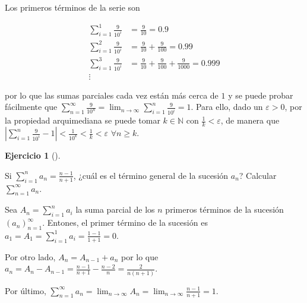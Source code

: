 \documentclass[
  a4paper,
]{scrreport}
\theoremstyle{definition}
\newtheorem{exercise}{Ejercicio}[chapter]
\theoremstyle{remark}
\begin{document}
\begin{tcolorbox}[enhanced jigsaw, rightrule=.15mm, opacityback=0, bottomtitle=1mm, titlerule=0mm, toprule=.15mm, breakable, colframe=quarto-callout-tip-color-frame, left=2mm, opacitybacktitle=0.6, title=\textcolor{quarto-callout-tip-color}{\faLightbulb}\hspace{0.5em}{Solución}, toptitle=1mm, colback=white, colbacktitle=quarto-callout-tip-color!10!white, arc=.35mm, bottomrule=.15mm, coltitle=black, leftrule=.75mm]

Los primeros términos de la serie son

\begin{align*}
\sum_{i=1}^1 \frac{9}{10^i} &= \frac{9}{10} = 0.9\\ 
\sum_{i=1}^2 \frac{9}{10^i} &= \frac{9}{10} + \frac{9}{100} = 0.99\\ 
\sum_{i=1}^3 \frac{9}{10^i} &= \frac{9}{10} + \frac{9}{100} + \frac{9}{1000} = 0.999\\ 
\vdots
\end{align*}

por lo que las sumas parciales cada vez están más cerca de \(1\) y se
puede probar fácilmente que
\(\sum_{n=1}^\infty \frac{9}{10^n} = \lim_{n\to\infty} \sum_{i=1}^n \frac{9}{10^i} = 1\).
Para ello, dado un \(\varepsilon>0\), por la propiedad arquimediana se
puede tomar \(k\in\mathbb{N}\) con \(\frac{1}{k}<\varepsilon\), de
manera que
\(|\sum_{i=1}^n \frac{9}{10^i} -1|<\frac{1}{10^k}<\frac{1}{k}<\varepsilon\)
\(\forall n\geq k\).

\end{tcolorbox}

\begin{exercise}[]\protect\hypertarget{exr-sumas-parciales}{}\label{exr-sumas-parciales}

Si \(\sum_{i=1}^n a_n=\frac{n-1}{n+1}\), ¿cuál es el término general de
la sucesión \(a_n\)? Calcular \(\sum_{n=1}^\infty a_n\).

\end{exercise}

\begin{tcolorbox}[enhanced jigsaw, rightrule=.15mm, opacityback=0, bottomtitle=1mm, titlerule=0mm, toprule=.15mm, breakable, colframe=quarto-callout-tip-color-frame, left=2mm, opacitybacktitle=0.6, title=\textcolor{quarto-callout-tip-color}{\faLightbulb}\hspace{0.5em}{Solución}, toptitle=1mm, colback=white, colbacktitle=quarto-callout-tip-color!10!white, arc=.35mm, bottomrule=.15mm, coltitle=black, leftrule=.75mm]

Sea \(A_n=\sum_{i=1}^n a_i\) la suma parcial de los \(n\) primeros
términos de la sucesión \((a_n)_{n=1}^\infty\). Entones, el primer
término de la sucesión es
\(a_1 = A_1= \sum_{i=1}^1 a_i = \frac{1-1}{1+1} = 0\).

Por otro lado, \(A_n=A_{n-1}+a_n\) por lo que
\(a_n=A_n-A_{n-1} = \frac{n-1}{n+1}-\frac{n-2}{n} = \frac{2}{n(n+1)}\).

Por último,
\(\sum_{n=1}^\infty a_n = \lim_{n\to\infty} A_n = \lim_{n\to\infty} \frac{n-1}{n+1} = 1\).

\end{tcolorbox}
\end{document}
